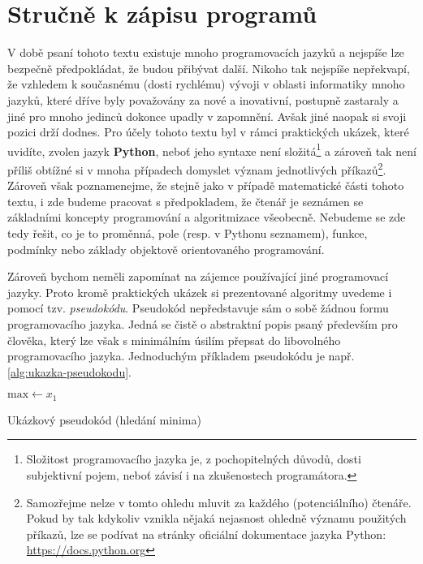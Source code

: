 \section{Stručně k zápisu programů}\label{sec:zapis-programu}

V době psaní tohoto textu existuje mnoho programovacích jazyků a nejspíše lze bezpečně předpokládat, že budou přibývat další. Nikoho tak nejspíše nepřekvapí, že vzhledem k současnému (dosti rychlému) vývoji v oblasti informatiky mnoho jazyků, které dříve byly považovány za nové a inovativní, postupně zastaraly a jiné pro mnoho jedinců dokonce upadly v zapomnění. Avšak jiné naopak si svoji pozici drží dodnes. Pro účely tohoto textu byl v rámci praktických ukázek, které uvidíte, zvolen jazyk \textbf{Python}, neboť jeho syntaxe není složitá\footnote{Složitost programovacího jazyka je, z pochopitelných důvodů, dosti subjektivní pojem, neboť závisí i na zkušenostech programátora.} a zároveň tak není příliš obtížné si v mnoha případech domyslet význam jednotlivých příkazů\footnote{Samozřejme nelze v tomto ohledu mluvit za každého (potenciálního) čtenáře. Pokud by tak kdykoliv vznikla nějaká nejasnost ohledně významu použitých příkazů, lze se podívat na stránky oficiální dokumentace jazyka Python: \url{https://docs.python.org}}. Zároveň však poznamenejme, že stejně jako v případě matematické části tohoto textu, i zde budeme pracovat s předpokladem, že čtenář je seznámen se základními koncepty programování a algoritmizace všeobecně. Nebudeme se zde tedy řešit, co je to proměnná, pole (resp. v Pythonu seznamem), funkce, podmínky nebo základy objektově orientovaného programování.

Zároveň bychom neměli zapomínat na zájemce používající jiné programovací jazyky. Proto kromě praktických ukázek si prezentované algoritmy uvedeme i pomocí tzv. \emph{pseudokódu}. Pseudokód nepředstavuje sám o sobě žádnou formu programovacího jazyka. Jedná se čistě o abstraktní popis psaný především pro člověka, který lze však s minimálním úsilím přepsat do libovolného programovacího jazyka. Jednoduchým příkladem pseudokódu je např. \ref{alg:ukazka-pseudokodu}.
\begin{algorithm}
    $\text{max}\gets x_1$\\
    \caption{Ukázkový pseudokód (hledání minima)}
    \label{alg:ukazka-pseudokodu}
\end{algorithm}

